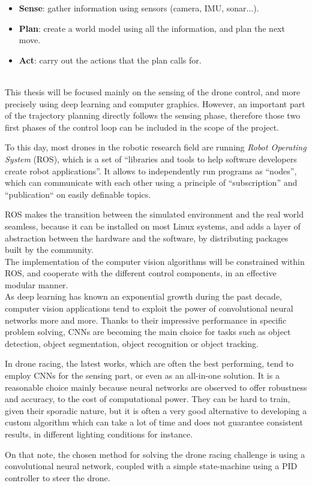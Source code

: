 \begin{itemize}
	\item{\textbf{Sense}}: gather information using sensors (camera, IMU, sonar...).
	\item{\textbf{Plan}}: create a world model using all the information, and plan
		the next move.
	\item{\textbf{Act}}: carry out the actions that the plan calls for.
\end{itemize}

~\\
This thesis will be focused mainly on the sensing of the drone control, and
more precisely using deep learning and computer graphics. However, an important
part of the trajectory planning directly follows the sensing phase, therefore
those two first phases of the control loop can be included in the scope of the
project.

To this day, most drones in the robotic research field are running \emph{Robot
Operating System} (ROS),  which is a set of ``libraries and
tools to help software developers create robot applications''. It allows to
independently run programs as ``nodes'', which can communicate with each other
using a principle of ``subscription'' and ``publication`` on easily definable
topics.

ROS makes the transition between the simulated environment and the real world
seamless, because it can be installed on most Linux systems, and adds a layer
of abstraction between the hardware and the software, by distributing packages
built by the community.\\

The implementation of the computer vision algorithms will be constrained within
ROS, and cooperate with the different control components, in an effective
modular manner.\\

As deep learning has known an exponential growth during the past decade,
computer vision applications tend to exploit the power of convolutional neural
networks more and more. Thanks to their impressive performance in specific
problem solving, CNNs are becoming the main choice for tasks such as object
detection, object segmentation, object recognition or object tracking.

In drone racing, the latest works, which are often the best performing, tend to
employ CNNs for the sensing part, or even as an all-in-one solution. It is a
reasonable choice mainly because neural networks are observed to offer
robustness and accuracy, to the cost of computational power. They can be hard
to train, given their sporadic nature, but it is often a very good alternative
to developing a custom algorithm which can take a lot of time and does not
guarantee consistent results, in different lighting conditions for instance.

On that note, the chosen method for solving the drone racing challenge is
using a convolutional neural network, coupled with a simple state-machine 
using a PID controller to steer the drone.
